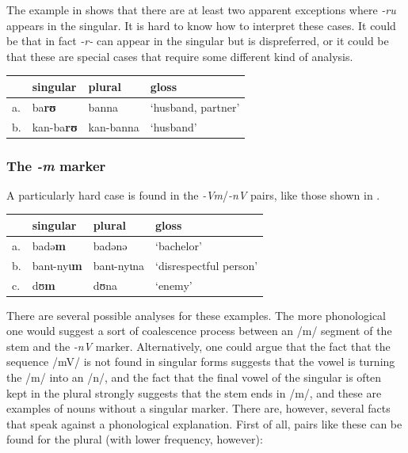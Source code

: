 The example in  shows that there are at least two apparent exceptions where \textit{-ru} appears in the singular. It is hard to know how to interpret these cases. It could be that in fact \textit{-r-} can appear in the singular but is dispreferred, or it could be that these are special cases that require some different kind of analysis.

\begin{exe}
    \ex \label{rusg-kasem-2}
    \begin{tabular}[t]{llll}
      & singular & plural    & gloss              \\
      \midrule
      a. & ba\textbf{rʊ}     & banna     & `husband, partner' \\
      b. & kan-ba\textbf{rʊ} & kan-banna & `husband'          \\
    \end{tabular}
\end{exe}

\subsubsection{The \textit{-m} marker}

A particularly hard case is found in the \textit{-Vm}/\textit{-nV} pairs, like those shown in .

\begin{exe}
    \ex \label{nm-exe}
    \begin{tabular}[t]{llll}
      & singular  & plural     & gloss                  \\
      \midrule
      a. & badə\textbf{m}     & badənə     & `bachelor'             \\
      b. & banɩ-nyɩ\textbf{m} & banɩ-nyɩna & `disrespectful person' \\
      c. & dʊ\textbf{m}       & dʊna       & `enemy'                \\
    \end{tabular}
\end{exe}

There are several possible analyses for these examples. The more phonological one would suggest a sort of coalescence process between an /m/ segment of the stem and the \textit{-nV} marker. Alternatively, one could argue that the fact that the sequence /mV/ is not found in singular forms suggests that the vowel is turning the /m/ into an /n/, and the fact that the final vowel of the singular is often kept in the plural strongly suggests that the stem ends in /m/, and these are examples of nouns without a singular marker. There are, however, several facts that speak against a phonological explanation. First of all, pairs like these can be found for the plural (with lower frequency, however):

